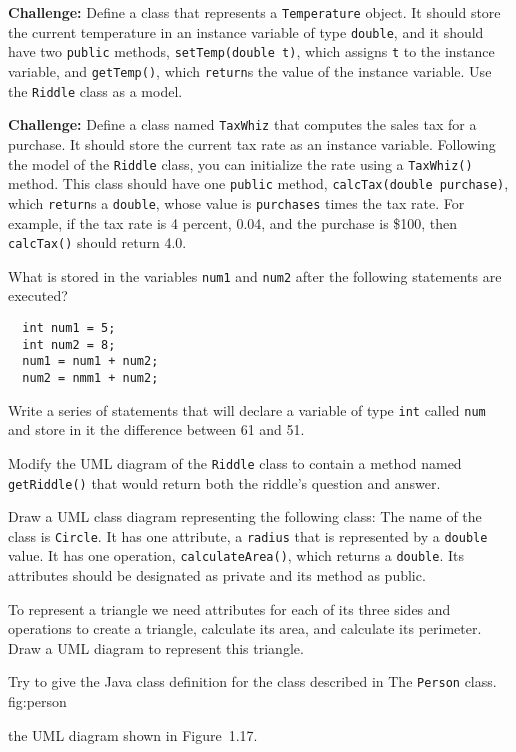 \begin{EXRtwo}
\item  {\bf Challenge:} Define a class that represents a {\tt Temperature}
object.   It should store the current temperature in an instance
variable of type {\tt double}, and it should have two {\tt public}
methods, {\tt setTemp(double t)}, which assigns {\tt t} to the
instance variable, and {\tt getTemp()}, which {\tt return}s the value
of the instance variable.   Use the {\tt Riddle} class as a model.

\item  {\bf Challenge:} Define a class named {\tt TaxWhiz} that computes the
sales tax for a purchase.  It should store the current tax rate as an
instance variable.   Following the model of the {\tt Riddle} class,
you can initialize the rate using a {\tt TaxWhiz()} method.   This
class should have one {\tt public} method, {\tt calcTax(double
purchase)}, which {\tt return}s a {\tt double}, whose value is
{\tt purchases} times the tax rate.  For example, if the tax rate is 4
percent, 0.04, and the purchase is \$100, then
{\tt calcTax()} should return 4.0.

\item What is stored in the variables {\tt num1} and {\tt num2} after the
following statements are executed?
\small
\begin{verbatim}
  int num1 = 5;
  int num2 = 8;
  num1 = num1 + num2;
  num2 = nmm1 + num2;
\end{verbatim}
\normalsize

\item Write a series of statements that will declare a variable of type {\tt int}
called {\tt num} and store in it the difference between 61 and 51.

\label{uml-exercises}

\item Modify the UML diagram of the {\tt Riddle}
class to contain a method named {\tt getRiddle()} that would return
both the riddle's question and answer.

\item Draw a UML class diagram representing the following
class: The name of the class is {\tt Circle}. It has one
attribute, a {\tt radius} that is represented by a {\tt double}
value. It has one operation, {\tt calculateArea()}, which
returns a {\tt double}. Its attributes should be designated
as private and its method as public.

\item To represent a triangle we need attributes for each of its three
sides and operations to create a triangle, calculate its area, and calculate
its perimeter. Draw a UML diagram to represent this triangle.

\item Try to give the Java class definition for the class described in
%
{The {\tt Person} class.}
{fig:person}

the UML diagram shown in Figure~1.17.

\end{EXRtwo}

